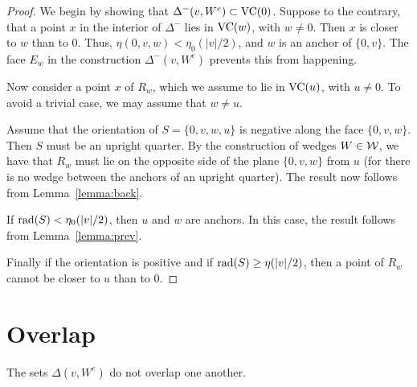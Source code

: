 \begin{proof}
We begin by showing that $\Delta^-(v,W^e)\subset{\operatorname{VC}}(0)$.
Suppose to the contrary, that a point $x$ in the interior of
$\Delta^-$ lies in ${\operatorname{VC}}(w)$, with $w\ne0$.  Then $x$ is closer
to $w$ than to  $0$.  Thus, $\eta(0,v,w)<\eta_0(|v|/2)$, and $w$
is an anchor of $\{0,v\}$.  The face $E_w$ in the construction
$\Delta^-(v,W^e)$ prevents this from happening.

Now consider a point $x$ of $R_w$, which we assume to lie in
${\operatorname{VC}}(u)$, with $u\ne0$.  To avoid a trivial case, we may
assume that $w\ne u$.

Assume that the orientation of $S=\{0,v,w,u\}$ is negative along
the face $\{0,v,w\}$.  Then $S$ must be an upright quarter.  By
the construction of wedges $W\in{\mathcal W}$, we have that $R_w$ must
lie on the opposite side of the plane $\{0,v,w\}$ from $u$ (for
there is no wedge between the anchors of an upright quarter).  The
result now follows from Lemma~\ref{lemma:back}.

If $\operatorname{rad}(S) <\eta_0(|v|/2)$, then $u$ and $w$ are anchors.  In
this case, the result follows from Lemma~\ref{lemma:prev}.

Finally if the orientation is positive and if $\operatorname{rad}(S)\ge
\eta(|v|/2)$, then a point of $R_w$ cannot be closer to $u$ than
to $0$.
\end{proof}


\section{Overlap}
    \label{sec:overlap}


\begin{lemma}  The sets $\Delta(v,W^e)$ do not overlap one another.
\end{lemma}

